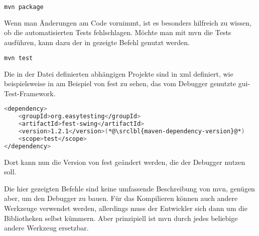 \begin{lstlisting}[language=sh,caption={Den Code eines Maven-Projekts packetieren},label=\lstlbl{maven-package}]
mvn package
\end{lstlisting}

Wenn man Änderungen am Code vornimmt, ist es besonders hilfreich zu wissen, ob die automatisierten Tests fehlschlagen. Möchte man mit \gls{mvn} die Tests ausführen, kann dazu der in  gezeigte Befehl genutzt werden.

\begin{lstlisting}[language=sh,caption={Die automatisierten Tests eines Maven-Projekts ausführen},label=\lstlbl{maven-test}]
mvn test
\end{lstlisting}

Die in der Datei  definierten abhängigen Projekte sind in \gls{xml} definiert, wie beispielsweise in  am Beispiel von \gls{fest} zu sehen, das vom Debugger genutzte \gls{gui}-Test-Framework.

\begin{lstlisting}[language=sh,caption={Konfiguration eines abhängigen Projekts in Maven},label=\lstlbl{maven-dependency}]
<dependency>
    <groupId>org.easytesting</groupId>
    <artifactId>fest-swing</artifactId>
    <version>1.2.1</version>(*@\srclbl{maven-dependency-version}@*)
    <scope>test</scope>
</dependency>
\end{lstlisting}

Dort kann nun die Version von \gls{fest} geändert werden, die der Debugger nutzen soll.

Die hier gezeigten Befehle sind keine umfassende Beschreibung von \gls{mvn}, genügen aber, um den Debugger zu bauen. Für das Kompilieren können auch andere Werkzeuge verwendet werden, allerdings muss der Entwickler sich dann um die Bibliotheken selbst kümmern. Aber prinzipiell ist \gls{mvn} durch jedes beliebige andere Werkzeug ersetzbar.